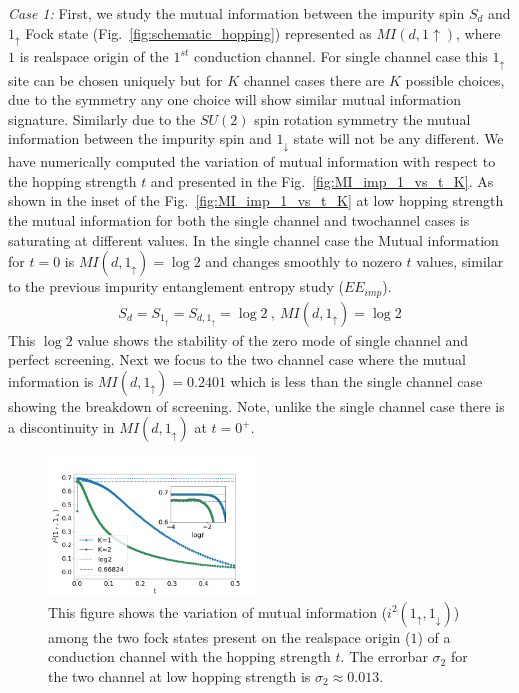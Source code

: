 \documentclass[reprint,prb,superscriptaddress]{revtex4-2}
\begin{document}
\par \textit{Case 1:} First, we study the mutual information between the impurity spin $S_d$ and $1_\uparrow$ Fock state (Fig.~\ref{fig:schematic_hopping}) represented as $MI(d,1\uparrow)$, where $1$ is realspace origin of the $1^{st}$ conduction channel. For single channel case this $1_{\uparrow}$ site can be chosen uniquely but for $K$ channel cases there are $K$ possible choices, due to the symmetry any one choice will show similar mutual information signature. Similarly due to the $SU(2)$ spin rotation symmetry the mutual information between the impurity spin and $1_{\downarrow}$ state will not be any different. We have numerically computed the variation of mutual information with respect to the hopping strength $t$ and presented in the Fig.~\ref{fig:MI_imp_1_vs_t_K}.  As shown in the inset of the Fig.~\ref{fig:MI_imp_1_vs_t_K} at low hopping strength the mutual information for both the single channel and twochannel cases is saturating at different values. In the single channel case the Mutual information for $t=0$ is $MI(d,1_{\uparrow})=\log 2$ and changes smoothly to nozero $t$ values, similar to the previous impurity entanglement entropy study ($EE_{imp}$).
\begin{eqnarray}
S_{d}=S_{1_{\uparrow}}=S_{d,1_{\uparrow}}=\log 2~,~MI(d,1_{\uparrow})=\log 2
\end{eqnarray}
This $\log 2$ value shows the stability of the zero mode of single channel and perfect screening. Next we focus to the two channel case where the mutual information is $MI(d,1_{\uparrow})=0.2401$ which is less than the single channel case showing the breakdown of screening. Note, unlike the single channel case there is a discontinuity in $MI(d,1_{\uparrow})$ at $t=0^+$.
\begin{figure}[!htpb]
\includegraphics[width=0.49\textwidth]{plt/A_I2_ch12_['1_up','1_down']}
\caption{This figure shows the variation of mutual information ($i^2(1_{\uparrow},1_{\downarrow})$) among the two fock states present on the realspace origin ($1$) of a conduction channel with the hopping strength $t$. The errorbar $\sigma_2$ for the two channel at low hopping strength is $\sigma_2\approx 0.013$.}
\label{fig:MI_1_2_vs_t_K}
\end{figure}
\end{document}

